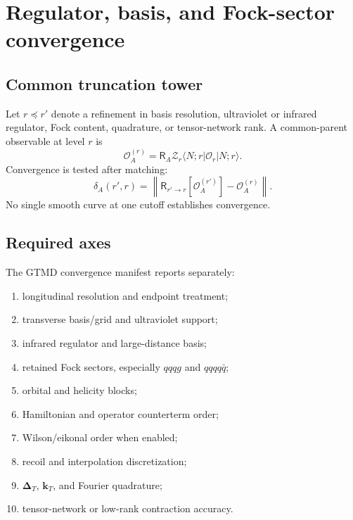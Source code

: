 \documentclass[11pt]{article}
\newcommand{\kT}{\bm{k}_{T}}
\newcommand{\DT}{\bm{\Delta}_{T}}
\newcommand{\cO}{\mathcal O}
\newcommand{\cZ}{\mathcal Z}
\begin{document}
\section{Regulator, basis, and Fock-sector convergence}
\label{sec:convergence}

\subsection{Common truncation tower}

Let \(r\preceq r'\) denote a refinement in basis resolution, ultraviolet or
infrared regulator, Fock content, quadrature, or tensor-network rank.  A
common-parent observable at level \(r\) is
\begin{equation}
 \cO_A^{(r)}
 =\mathsf R_A\cZ_r
 \langle N;r|\cO_r|N;r\rangle.
\label{eq:observable-at-r}
\end{equation}
Convergence is tested after matching:
\begin{equation}
 \delta_A(r',r)
 =\left\|
 \mathsf R_{r'\to r}\!\left[\cO_A^{(r')}\right]
 -\cO_A^{(r)}
 \right\|.
\label{eq:gtmd-convergence-residual}
\end{equation}
No single smooth curve at one cutoff establishes convergence.

\subsection{Required axes}

The GTMD convergence manifest reports separately:
\begin{enumerate}
\item longitudinal resolution and endpoint treatment;
\item transverse basis/grid and ultraviolet support;
\item infrared regulator and large-distance basis;
\item retained Fock sectors, especially \(qqqg\) and \(qqqq\bar q\);
\item orbital and helicity blocks;
\item Hamiltonian and operator counterterm order;
\item Wilson/eikonal order when enabled;
\item recoil and interpolation discretization;
\item \(\DT\), \(\kT\), and Fourier quadrature;
\item tensor-network or low-rank contraction accuracy.
\end{enumerate}
\end{document}
